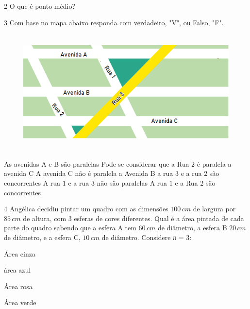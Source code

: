 \begin{escolha}
\item {}
\item {}
\item {}
\item {}
\item {}
\item {}
\end{escolha}

\num{2}  O que é ponto médio?


\num{3}  Com base no mapa abaixo responda com verdadeiro, "V", ou Falso, "F".

\begin{figure}
\includegraphics[width=5.47917in,height=2.48958in]{./imgSAEB_6_MAT/media/image53.png}
\end{figure}

\begin{boxlist}
\boxitem[\rosa{V}] As avenidas A e B são paralelas
\boxitem[\rosa{F}] Pode se considerar que a Rua $2$ é paralela a avenida C
\boxitem[\rosa{F}] A avenida C não é paralela a Avenida B
\boxitem[\rosa{V}] a rua $3$ e a rua $2$ são concorrentes
\boxitem[\rosa{V}] A rua $1$ e a rua $3$ não são paralelas
\boxitem[\rosa{F}] A rua $1$ e a Rua $2$ são concorrentes
\end{boxlist}

\num{4}  Angélica decidiu pintar um quadro com as dimensões $100\,cm$ de largura
por $85\,cm$ de altura, com $3$ esferas de cores diferentes. Qual é a área
pintada de cada parte do quadro sabendo que a esfera A tem $60\,cm$ de
diâmetro, a esfera B $20\,cm$ de diâmetro, e a esfera C, $10\,cm$ de diâmetro. Considere π = $3$:

\begin{escolha}
\item Área cinza 
\item área azul 
\item Área rosa 
\item Área verde 
\end{escolha}

